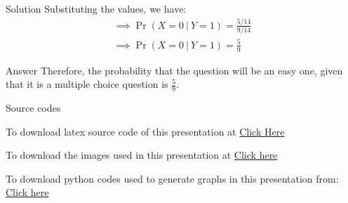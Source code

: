 \documentclass{beamer}
\providecommand{\pr}[1]{\ensuremath{\Pr\left(#1\right)}}
\numberwithin{equation}{subsection}
\begin{document}
\begin{frame}{Solution}
    Substituting the values, we have:
\begin{align}
    \implies \pr{X = 0\ |\ Y = 1} = \frac{5/14}{9/14}\\
    \implies \pr{X = 0\ |\ Y = 1} = \frac{5}{9}
\end{align}

\begin{block}{Answer}
    Therefore, the probability that the question will be an easy one, given that it is a multiple choice question is $\displaystyle\frac{5}{9}$.
\end{block}

\end{frame}

\begin{frame}{Source codes}
    \begin{block}{To download latex source code of this presentation at}
        \href{https://github.com/TushitaSharva/PRV_2022/blob/main/ASSIGNMENT_4/main(beamer).pdf}{Click Here}
    \end{block}
    
    \begin{block}{To download the images used in this presentation at}
        \href{https://github.com/TushitaSharva/PRV_2022/tree/main/ASSIGNMENT_4/Images}{Click here}
    \end{block}
    
    \begin{block}{To download python codes used to generate graphs in this presentation from:}
        \href{https://github.com/TushitaSharva/PRV_2022/tree/main/ASSIGNMENT_4/python codes}{Click here}
    \end{block}
    
\end{frame}
\end{document}
